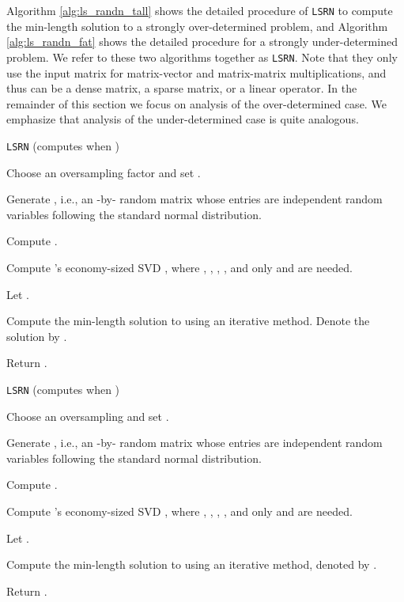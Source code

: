 \documentclass{siamltex}
\begin{document}
Algorithm \ref{alg:ls_randn_tall} shows the detailed procedure of \texttt{LSRN}
to compute the min-length solution to a strongly over-determined problem, and
Algorithm \ref{alg:ls_randn_fat} shows the detailed procedure for a strongly
under-determined problem.  We refer to these two algorithms together as
\texttt{LSRN}.  Note that they only use the input matrix  for matrix-vector
and matrix-matrix multiplications, and thus  can be a dense matrix, a sparse
matrix, or a linear operator.  In the remainder of this section we focus on
analysis of the over-determined case. We emphasize that analysis of the
under-determined case is quite analogous.

\begin{algorithm}
  \caption{\texttt{LSRN} (computes  when )}
  \label{alg:ls_randn_tall}
  \begin{algorithmic}[1]
    \STATE Choose an oversampling factor  and set .

    \STATE Generate , i.e., an -by- random matrix
    whose entries are independent random variables following the standard normal
    distribution.

    \STATE Compute .

    \STATE Compute 's economy-sized SVD , where , , , , and only  and  are
    needed.
    
    \STATE Let .
  
    \STATE Compute the min-length solution to  using
    an iterative method. Denote the solution by .

    \STATE Return .
  \end{algorithmic}
\end{algorithm}

\begin{algorithm}
  \caption{\texttt{LSRN} (computes  when )}
  \label{alg:ls_randn_fat}
  \begin{algorithmic}[1]
    \STATE Choose an oversampling  and set .

    \STATE Generate , i.e., an -by- random matrix
    whose entries are independent random variables following the standard normal
    distribution.

    \STATE Compute .

    \STATE Compute 's economy-sized SVD , where , , , , and only  and  are
    needed.
    
    \STATE Let .
  
    \STATE Compute the min-length solution to 
    using an iterative method, denoted by .

    \STATE Return .
  \end{algorithmic}
\end{algorithm}
\end{document}
